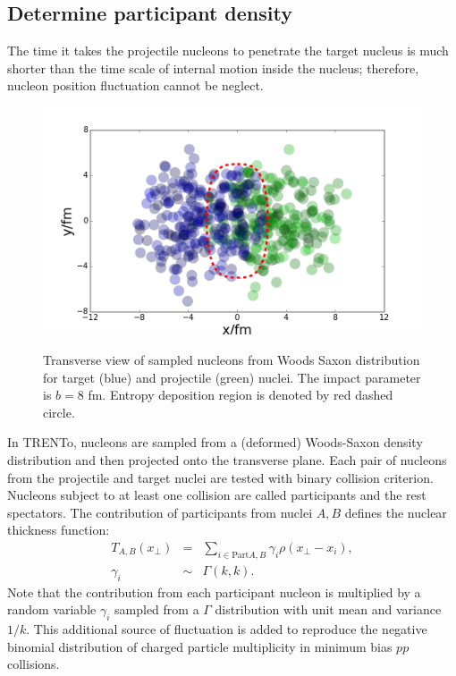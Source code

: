 \documentclass[aps,prl,twocolumn,groupedaddress]{revtex4-1}
\begin{document}
	\subsection{Determine participant density}
	The time it takes the projectile nucleons to penetrate the target nucleus is much shorter than the time scale of internal motion inside the nucleus; therefore, nucleon position fluctuation cannot be neglect.
	\begin{figure}
	\begin{center}
	\includegraphics[width=\columnwidth]{pics/nuclei.png}
	\label{nuclei}
	\caption{Transverse view of sampled nucleons from Woods Saxon distribution for target (blue) and projectile (green) nuclei. The impact parameter is $b = 8$ fm. Entropy deposition region is denoted by red dashed circle.}
	\end{center}
	\end{figure}
	
	In TRENTo, nucleons are sampled from a (deformed) Woods-Saxon density distribution and then projected onto the transverse plane. 
	Each pair of nucleons from the projectile and target nuclei are tested with binary collision criterion. 
	Nucleons subject to at least one collision are called participants and the rest spectators.
	The contribution of participants from nuclei $A,B$ defines the nuclear thickness function:
	\begin{eqnarray}
		T_{A,B}(x_\perp) &=& \sum_{i \in \textrm{Part} A,B} \gamma_i \rho(x_\perp- x_i), \\
		\gamma_i &\sim& \Gamma(k, k).
	\end{eqnarray}
	Note that the contribution from each participant nucleon is multiplied by a random variable $\gamma_i$ sampled from a $\Gamma$ distribution with unit mean and variance $1/k$. 
	This additional source of fluctuation is added to reproduce the negative binomial distribution of charged particle multiplicity in minimum bias $pp$ collisions.
\end{document}
